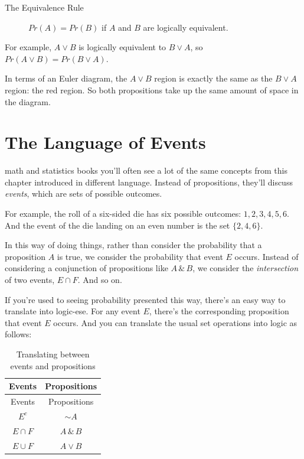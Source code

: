 \documentclass[justified]{tufte-book}
\newcommand{\p}{Pr}
\theoremstyle{definition}
\theoremstyle{definition}
\theoremstyle{definition}
\theoremstyle{remark}
\begin{document}
\begin{description}
\item[The Equivalence Rule]
\(\p(A) = \p(B)\) if \(A\) and \(B\) are logically equivalent.
\end{description}

For example, \(A \vee B\) is logically equivalent to \(B \vee A\), so
\(\p(A \vee B) = \p(B \vee A)\).

In terms of an Euler diagram, the \(A \vee B\) region is exactly the
same as the \(B \vee A\) region: the red region. So both propositions
take up the same amount of space in the diagram.

\hypertarget{the-language-of-events}{%
\section{The Language of Events}\label{the-language-of-events}}

 math and statistics books you'll often see a lot of the
same concepts from this chapter introduced in different language.
Instead of propositions, they'll discuss \emph{events}, which are sets
of possible outcomes.

For example, the roll of a six-sided die has six possible outcomes:
\(1, 2, 3, 4, 5, 6\). And the event of the die landing on an even number
is the set \(\{2, 4, 6\}\).

In this way of doing things, rather than consider the probability that a
proposition \(A\) is true, we consider the probability that event \(E\)
occurs. Instead of considering a conjunction of propositions like
\(A \,\&\, B\), we consider the \emph{intersection} of two events,
\(E \cap F\). And so on.

If you're used to seeing probability presented this way, there's an easy
way to translate into logic-ese. For any event \(E\), there's the
corresponding proposition that event \(E\) occurs. And you can translate
the usual set operations into logic as follows:

\begin{longtable}[]{@{}cc@{}}
\caption{\label{tab:unnamed-chunk-57}Translating between events and
propositions}\tabularnewline
\toprule
Events & Propositions\tabularnewline
\midrule
\endfirsthead
\toprule
Events & Propositions\tabularnewline
\midrule
\endhead
\(E^c\) & \(\sim\! A\)\tabularnewline
\(E \cap F\) & \(A \,\&\, B\)\tabularnewline
\(E \cup F\) & \(A \vee B\)\tabularnewline
\bottomrule
\end{longtable}
\end{document}
